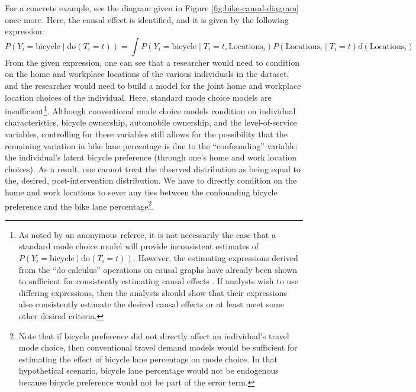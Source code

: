 For a concrete example, see the diagram given in Figure \ref{fig:bike-causal-diagram} once more. Here, the causal effect is identified, and it is given by the following expression:
\begin{equation}
\label{eq:bike-covariate-adjustment}
P \left( Y_i = \textrm{bicycle} \mid \textrm{do} \left( T_i = t \right) \right) = \int P \left( Y_i = \textrm{bicycle} \mid T_i = t, \textrm{Locations$_i$} \right) P \left( \textrm{Locations$_i$} \mid T_i = t \right) d \left( \textrm{Locations}_i \right)
\end{equation}
From the given expression, one can see that a researcher would need to condition on the home and workplace locations of the various individuals in the dataset, and the researcher would need to build a model for the joint home and workplace location choices of the individual. Here, standard mode choice models are insufficient\footnote{As noted by an anonymous referee, it is not necessarily the case that a standard mode choice model will provide inconsistent estimates of $P \left( Y_i = \textrm{bicycle} \mid \textrm{do} \left( T_i = t \right) \right)$. However, the estimating expressions derived from the ``do-calculus'' operations on causal graphs have already been shown to sufficient for consistently estimating causal effects \citep{galles_1998_axiomatic, huang_2006_pearl}. If analysts wish to use differing expressions, then the analysts should show that their expressions also consistently estimate the desired causal effects or at least meet some other desired criteria.}. Although conventional mode choice models condition on individual characteristics, bicycle ownership, automobile ownership, and the level-of-service variables, controlling for these variables still allows for the possibility that the remaining variation in bike lane percentage is due to the ``confounding'' variable: the individual's latent bicycle preference (through one's home and work location choices). As a result, one cannot treat the observed distribution as being equal to the, desired, post-intervention distribution. We have to directly condition on the home and work locations to sever any ties between the confounding bicycle preference and the bike lane percentage\footnote{Note that if bicycle preference did not directly affect an individual's travel mode choice, then conventional travel demand models would be sufficient for estimating the effect of bicycle lane percentage on mode choice. In that hypothetical scenario, bicycle lane percentage would not be endogenous because bicycle preference would not be part of the error term.}.

